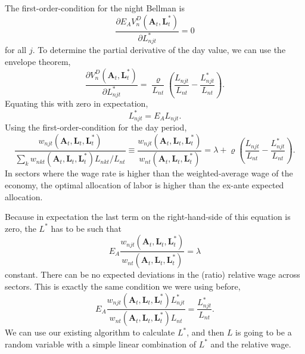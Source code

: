 \documentclass[12pt]{article}
\begin{document}
The first-order-condition for the night Bellman is
\[
\frac 
	{\partial E_{A} V_n^D(\mathbf A_{t}, \mathbf L_{t}^*)}
	{\partial L_{njt}^*}
	= 0
\]
for all $j$. To determine the partial derivative of the day value, we can use the envelope theorem,
\[
\frac 
	{\partial V_n^D(\mathbf A_{t}, \mathbf L_{t}^*)}
	{\partial L_{njt}^*}
	= 
	\frac \varrho {L_{nt}}
	\left(
				\frac {L_{njt}} {L_{nt}}
				- 
				\frac {L_{njt}^*} {L_{nt}}
	\right).
\]
Equating this with zero in expectation,
\[
L_{njt}^* = E_{A} L_{njt}.
\]
Using the first-order-condition for the day period,
\[
\frac 
	{w_{njt}(\mathbf A_{t}, \mathbf L_{t}, \mathbf L_{t}^*)}
	{\sum_k w_{nkt}(\mathbf A_{t}, \mathbf L_{t}, \mathbf L_{t}^*)L_{nkt}/L_{nt}}
\equiv 
\frac 
	{w_{njt}(\mathbf A_{t}, \mathbf L_{t}, \mathbf L_{t}^*)}
	{w_{nt}(\mathbf A_{t}, \mathbf L_{t}, \mathbf L_{t}^*)}
= \lambda+
	\varrho 
	\left(
				\frac {L_{njt}} {L_{nt}}
				- 
				\frac {L_{njt}^*} {L_{nt}}
	\right).
\]
In sectors where the wage rate is higher than the weighted-average wage of the economy, the optimal allocation of labor is higher than the ex-ante expected allocation.

Because in expectation the last term on the right-hand-side of this equation is zero, the $L^*$ has to be such that
\[
E_{A}\frac 
	{w_{njt}(\mathbf A_{t}, \mathbf L_{t}, \mathbf L_{t}^*)}
	{w_{nt}(\mathbf A_{t}, \mathbf L_{t}, \mathbf L_{t}^*)}
= \lambda
\]
constant. There can be no expected deviations in the (ratio) relative wage across sectors. This is exactly the same condition we were using before,
\[
E_{A}
\frac 
	{w_{njt}(\mathbf A_{t}, \mathbf L_{t}, \mathbf L_{t}^*)L_{njt}^*}
	{w_{nt}(\mathbf A_{t}, \mathbf L_{t}, \mathbf L_{t}^*)L_{nt}}
= 
\frac 
	{L_{njt}^*}
	{L_{nt}}.
\]
We can use our existing algorithm to calculate $L^*$, and then $L$ is going to be a random variable with a simple linear combination of $L^*$ and the relative wage.
\end{document}
